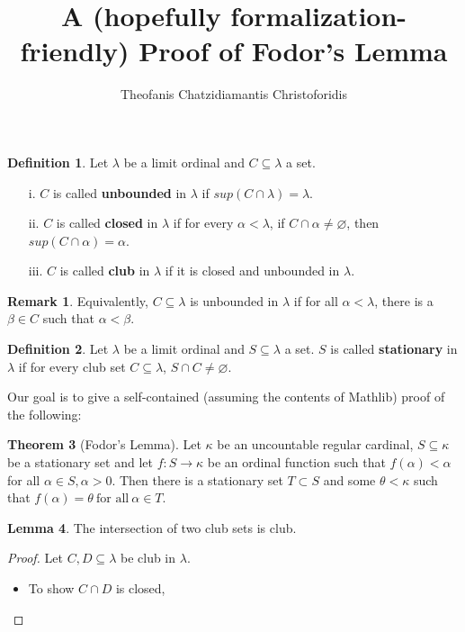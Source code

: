 \documentclass[11pt]{article}
\title{A (hopefully formalization-friendly) Proof of Fodor's Lemma}
\author{Theofanis Chatzidiamantis Christoforidis}
\date{}
\theoremstyle{definition}
\newtheorem{defin}{Definition}
\newtheorem{lem}[defin]{Lemma}
\newtheorem{thm}[defin]{Theorem}
\newtheorem{rem}{Remark}[defin]
\begin{document}
\maketitle

\begin{defin}
    Let $\lambda$ be a limit ordinal and $C\subseteq \lambda$ a set.
    \begin{enumerate} \itemsep0.2em
        \item[i.]  $C$ is called \textbf{unbounded} in $\lambda$ if $sup(C\cap \lambda)=\lambda$.
        \item[ii.] $C$ is called \textbf{closed} in $\lambda$ if for every $\alpha < \lambda$,
        if $C\cap\alpha\neq\varnothing$, then $sup(C\cap\alpha)=\alpha$.
        \item[iii.] $C$ is called \textbf{club} in $\lambda$ if it is closed and unbounded
        in $\lambda$.
    \end{enumerate}
\end{defin}

\begin{rem}
    Equivalently, $C\subseteq\lambda$ is unbounded in $\lambda$ if for all $\alpha < \lambda$, there is
    a $\beta\in C$ such that $\alpha<\beta$.
\end{rem}

\begin{defin}
    Let $\lambda$ be a limit ordinal and $S\subseteq \lambda$ a set. $S$ is called
    \textbf{stationary} in $\lambda$ if for every club set $C\subseteq\lambda$,
    $S\cap C\neq\varnothing$.
\end{defin}

Our goal is to give a self-contained (assuming the contents of Mathlib) proof of the following:

\begin{thm}[Fodor's Lemma]
   Let $\kappa$ be an uncountable regular cardinal, $S\subseteq\kappa$ be a
   stationary set and let $f:S\rightarrow \kappa$ be an ordinal function such
   that $f(\alpha)<\alpha$ for all $\alpha\in S, \alpha>0$. Then there is a
   stationary set $T\subset S$ and some $\theta <\kappa$ such that
   $f(\alpha)=\theta \ \text{for all} \ \alpha\in T.$
\end{thm}

\begin{lem}
    The intersection of two club sets is club.
\end{lem}

\begin{proof}
    Let $C,D\subseteq\lambda$ be club in $\lambda$.
    \begin{itemize}
        \item To show $C\cap D$ is closed,
    \end{itemize}
\end{proof}
\end{document}
